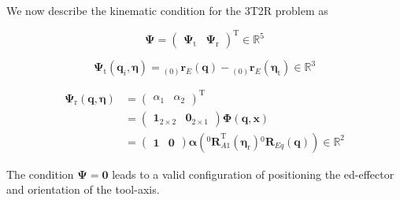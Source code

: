 \documentclass[twocolumn,10pt]{IFTOMM}
\newcommand{\bm}[1]{\boldsymbol{#1}}
\newcommand{\ortvek}[4]{{ }_{(#1)}{\boldsymbol{#2}}^{#3}_{#4} }
\newcommand{\rotmat}[2]{{{ }^{#1}\boldsymbol{R}}_{#2}}
\newcommand{\transp}[0]{{\mathrm{T}}}
\begin{document}
We now describe the kinematic condition for the 3T2R problem as

\begin{equation}
\bm{\Psi}=\begin{pmatrix}
\bm{\Psi}_{\mathrm{t}} & \bm{\Psi}_{\mathrm{r}}
\end{pmatrix}^\transp \in {\mathbb{R}}^{5}
\end{equation}

\begin{equation}
\bm{\Psi}_{\mathrm{t}}(\bm{q}_i,\bm{\eta}) = \ortvek{0}{r}{}{E}(\bm{q}) - \ortvek{0}{r}{}{E}(\bm{\eta}_{\mathrm{t}}) \in {\mathbb{R}}^{3}
\end{equation}



\begin{align}
\bm{\Psi}_{\mathrm{r}}(\bm{q},\bm{\eta}) &= 
\begin{pmatrix}
\alpha_1  & \alpha_2
\end{pmatrix}^\transp  \\
&=
\begin{pmatrix} \bm{1}_{2 \times 2} & \bm{0}_{2 \times 1}\end{pmatrix} \bm{\Phi} (\bm{q},\bm{x}) \\
&= \begin{pmatrix} \bm{1} & \bm{0}\end{pmatrix} \bm{\alpha}\left(\rotmat{0}{A1}^\transp (\bm{\eta}_{\mathrm{r}})\rotmat{0}{Eq}(\bm{q})\right) \in {\mathbb{R}}^{2}
\end{align}

The condition $\bm{\Psi}=\bm{0}$ leads to a valid configuration of positioning the ed-effector and orientation of the tool-axis.




%
%
%
\end{document}
